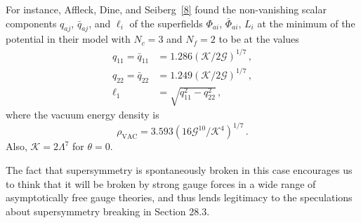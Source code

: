For instance, Affleck, Dine, and Seiberg~\hyperref[ch29-ref-8]{[8]} found
the non-vanishing scalar components \(q_{aj}\), \(\bar q_{aj}\), and
\(\ell_i\) of the superfields \(\Phi_{ai}\), \(\bar\Phi_{ai}\), \(L_i\)
at the minimum of the potential in their model with \(N_c=3\) and
\(N_f=2\) to be at the values
\begin{equation}
  \begin{aligned}
    q_{11}=\bar q_{11}
      &=1.286\left(\mathcal{K}/2\mathcal{G}\right)^{1/7}\,,
    \\
    q_{22}=\bar q_{22}
      &=1.249\left(\mathcal{K}/2\mathcal{G}\right)^{1/7}\,,
    \\
    \ell_1&=\sqrt{q_{11}^2-q_{22}^2}\,,
  \end{aligned}
  \tag{29.4.22}\label{eq:29.4.22}
\end{equation}
where the vacuum energy density is
\begin{equation}
  \rho_{\mathrm{VAC}}
  =
  3.593\left(16\mathcal{G}^{10}/\mathcal{K}^4\right)^{1/7}\,.
  \tag{29.4.23}\label{eq:29.4.23}
\end{equation}
Also, \(\mathcal{K}=2\Lambda^7\) for \(\theta=0\).

The fact that supersymmetry is spontaneously broken in this case encourages
us to think that it will be broken by strong gauge forces in a wide range
of asymptotically free gauge theories, and thus lends legitimacy to the
speculations about supersymmetry breaking in Section 28.3.
